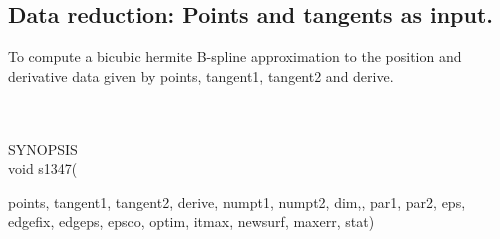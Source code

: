 \subsection{Data reduction: Points and tangents as input.}
\begin{minipg1}
  To compute a bicubic hermite B-spline approximation to the position and
  derivative data given by points, tangent1, tangent2 and derive.
\end{minipg1} \\ \\
SYNOPSIS\\
        \>void s1347(\begin{minipg3}
        {\fov points}, {\fov tangent1}, {\fov tangent2}, {\fov derive}, {\fov numpt1}, {\fov numpt2}, {\fov dim},, {\fov par1},
        {\fov par2}, {\fov eps}, {\fov edgefix}, {\fov edgeps}, {\fov epsco}, {\fov optim}, {\fov itmax}, {\fov newsurf}, {\fov maxerr},
                                stat)
                \end{minipg3}\\[0.3ex]

